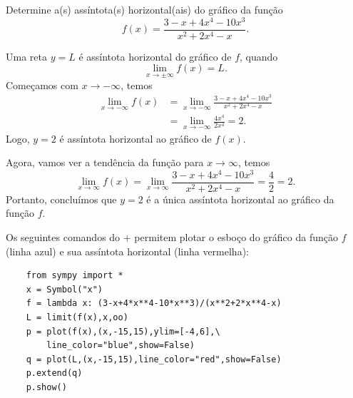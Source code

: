 \begin{exeresol}
  Determine a(s) assíntota(s) horizontal(ais) do gráfico da função
  \begin{equation}
    f(x) = \frac{3 - x + 4x^4 - 10x^3}{x^2 + 2x^4 -x}.
  \end{equation}
\end{exeresol}
\begin{resol}
  Uma reta $y = L$ é assíntota horizontal do gráfico de $f$, quando
  \begin{equation}
    \lim_{x\to\pm\infty} f(x) = L.
  \end{equation}
  Começamos com $x\to-\infty$, temos
  \begin{align}
    \lim_{x\to-\infty} f(x) &= \lim_{x\to-\infty} \frac{3 - x + 4x^4 - 10x^3}{x^2 + 2x^4 -x} \\
                            &= \lim_{x\to -\infty} \frac{4x^4}{2x^4} = 2.
  \end{align}
  Logo, $y=2$ é assíntota horizontal ao gráfico de $f(x)$.

  Agora, vamos ver a tendência da função para $x\to\infty$, temos
  \begin{equation}
    \lim_{x\to\infty} f(x) = \lim_{x\to\infty} \frac{3 - x + 4x^4 - 10x^3}{x^2 + 2x^4 -x} = \frac{4}{2} = 2.
  \end{equation}
  Portanto, concluímos que $y=2$ é a única assíntota horizontal ao gráfico da função $f$.

  \ifispython
  Os seguintes comandos do {\python}+{\sympy} permitem plotar o esboço do gráfico da função $f$ (linha azul) e sua assíntota horizontal (linha vermelha):
  \begin{lstlisting}
    from sympy import *
    x = Symbol("x")
    f = lambda x: (3-x+4*x**4-10*x**3)/(x**2+2*x**4-x)
    L = limit(f(x),x,oo)
    p = plot(f(x),(x,-15,15),ylim=[-4,6],\
        line_color="blue",show=False)
    q = plot(L,(x,-15,15),line_color="red",show=False)
    p.extend(q)
    p.show()
  \end{lstlisting}
  \fi
\end{resol}


